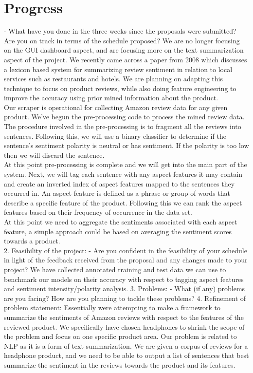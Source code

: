 \documentclass{article}
\begin{document}
\section{Progress}
- What have you done in the three weeks since the proposals were submitted? Are you on track in terms of the schedule proposed?
We are no longer focusing on the GUI dashboard aspect, and are focusing more on the text summarization aspect of the project. We recently came across a paper from 2008 which discusses a lexicon based system for summarizing review sentiment in relation to local services such as restaurants and hotels. We are planning on adapting this technique to focus on product reviews, while also doing feature engineering to improve the accuracy using prior mined information about the product.\\
Our scraper is operational for collecting Amazon review data for any given product. We've begun the pre-processing code to process the mined review data.\\
The procedure involved in the pre-processing is to fragment all the reviews into sentences. Following this, we will use a binary classifier to determine if the sentence's sentiment polarity is neutral or has sentiment. If the polarity is too low then we will discard the sentence. \\
At this point pre-processing is complete and we will get into the main part of the system. Next, we will tag each sentence with any aspect features it may contain and create an inverted index of aspect features mapped to the sentences they occurred in. An aspect feature is defined as a phrase or group of words that describe a specific feature of the product. Following this we can rank the aspect features based on their frequency of occurrence in the data set.\\
At this point we need to aggregate the sentiments associated with each aspect feature, a simple approach could be based on averaging the sentiment scores towards a product.\\
2. Feasibility of the project:
- Are you confident in the feasibility of your schedule in light of the feedback received from the proposal and any changes made to your project?
We have collected annotated training and test data we can use to benchmark our models on their accuracy with respect to tagging aspect features and sentiment intensity/polarity analysis.
3. Problems:
- What (if any) problems are you facing? How are you planning to tackle these problems?
4. Refinement of problem statement:
Essentially were attempting to make a framework to summarize the sentiments of Amazon reviews with respect to the features of the reviewed product. We specifically have chosen headphones to shrink the scope of the problem and focus on one specific product area. Our problem is related to NLP as it is a form of text summarization. 
We are given a corpus of reviews for a headphone product, and we need to be able to output a list of sentences that best summarize the sentiment in the reviews towards the product and its features. 
\end{document}
